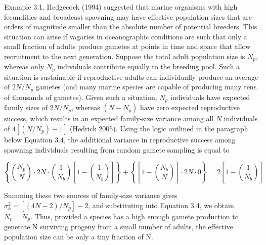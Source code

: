 \documentclass{article}
\begin{document}
Example 3.1. Hedgecock (1994) suggested that marine organisms with high fecundities and broadcast spawning may have effective population sizes that are orders of magnitude smaller than the absolute number of potential breeders. This situation can arise if vagaries in oceanographic conditions are such that only a small fraction of adults produce gametes at points in time and space that allow recruitment to the next generation. Suppose the total adult population size is  $ N_p $, whereas only  $ N_p $ individuals contribute equally to the breeding pool. Such a situation is sustainable if reproductive adults can individually produce an average of  $ 2N/N_p $ gametes (and many marine species are capable of producing many tens of thousands of gametes). Given such a situation,  $ N_p $ individuals have expected family sizes of  $ 2N/N_p $, whereas  $ (N - N_p) $ have zero expected reproductive success, which results in an expected family-size variance among all  $ N $ individuals of  $ 4[(N/N_p) - 1] $ (Hedrick 2005). Using the logic outlined in the paragraph below Equation 3.4, the additional variance in reproductive success among spawning individuals resulting from random gamete sampling is equal to

\begin{equation}
\left\{\left(\frac{N_{p}}{N}\right)\cdot2N\cdot\left(\frac{1}{N_{b}}\right)\left[1-\left(\frac{1}{N_{b}}\right)\right]\right\}+\left\{\left[1-\left(\frac{N_{b}}{N}\right)\right]\cdot2N\cdot0\right\}=2\left[1-\left(\frac{1}{N_{b}}\right)\right]
\end{equation}

Summing these two sources of family-size variance gives  $ \sigma_k^2 = [(4N - 2)/N_p] - 2 $, and substituting into Equation 3.4, we obtain  $ N_e = N_p $. Thus, provided a species has a high enough gamete production to generate N surviving progeny from a small number of adults, the effective population size can be only a tiny fraction of N.
\end{document}
